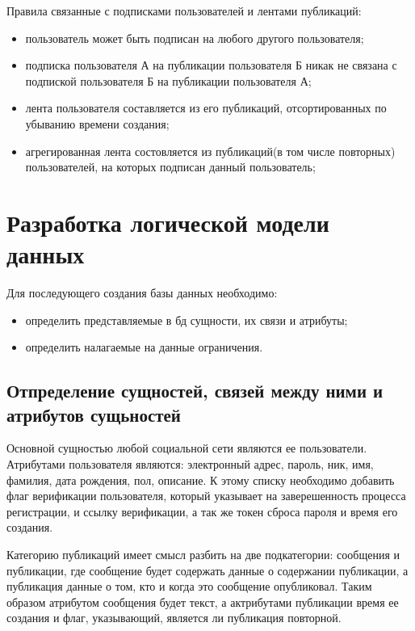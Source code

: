 Правила связанные с подписками пользователей и лентами публикаций:
\begin{itemize}
\item пользователь может быть подписан на любого другого пользователя;
\item подписка пользователя А на публикации пользователя Б никак не связана
  с подпиской пользователя Б на публикации пользователя А;
\item лента пользователя составляется из его публикаций, отсортированных по убыванию времени создания;
\item агрегированная лента состовляется из публикаций(в том числе повторных) пользователей, на которых подписан
  данный пользователь;
\end{itemize}




\section{Разработка логической модели данных}

Для последующего создания базы данных необходимо:
\begin{itemize}
\item определить представляемые в бд сущности, их связи и атрибуты;
\item определить налагаемые на данные ограничения.
\end{itemize}

\subsection{Отпределение сущностей, связей между ними и атрибутов сущьностей}
Основной сущностью любой социальной сети являются ее пользователи.
Атрибутами пользователя являются: электронный адрес, пароль, ник, имя, фамилия, дата рождения, пол, описание.
К этому списку необходимо добавить флаг верификации пользователя, который указывает на заверешенность процесса
регистрации, и ссылку верификации, а так же токен сброса пароля и время его создания.

Категорию публикаций имеет смысл разбить на две подкатегории: сообщения и публикации, где сообщение будет содержать
данные о содержании публикации, а публикация данные о том, кто и когда это сообщение опубликовал.
Таким образом атрибутом сообщения будет текст, а актрибутами публикации время ее создания и флаг, указывающий,
является ли публикация повторной.

